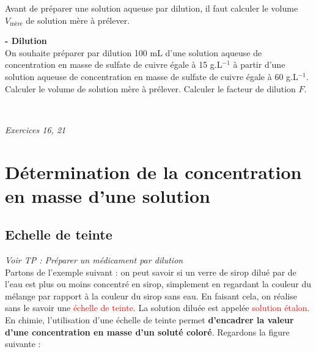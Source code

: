 Avant de préparer une solution aqueuse par  dilution, il faut calculer le volume $V_{\text{mère}}$ de solution mère à 
prélever.\\

\begin{mdframed}[style=autreexo]
\textbf{ - Dilution}\\
On souhaite préparer par dilution 100 mL d’une solution aqueuse de concentration en masse de sulfate de cuivre égale à 15 g.L$^{-1}$ à partir d’une solution aqueuse de concentration en masse de sulfate de cuivre égale à 60 g.L$^{-1}$. Calculer le volume de solution mère à prélever. Calculer le facteur de dilution $F$.
\end{mdframed}

\newline
{}
\newline
{}
\newline
{}\\

\begin{Large}
\end{Large}\textit{Exercices 16, 21}
\section{Détermination de la concentration en masse d'une solution}

\subsection{Echelle de teinte}
\begin{Large}
\end{Large}\textit{Voir TP : Préparer un médicament par dilution}\\
Partons de l'exemple suivant : on peut savoir si un verre de sirop dilué par de l'eau est plus ou moins concentré en sirop, simplement en regardant la couleur du mélange par rapport à la couleur du sirop sans eau. En faisant cela, on réalise sans le savoir une \textcolor{red}{échelle de teinte}. La solution diluée est appelée \textcolor{red}{solution étalon}.\\
En chimie, l'utilisation d'une échelle de teinte permet \textbf{d'encadrer la valeur d'une concentration en masse d'un soluté coloré}. Regardons la figure suivante :


